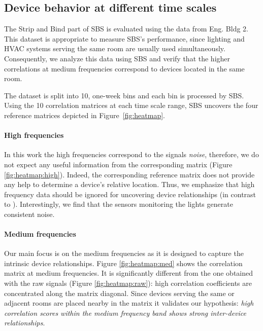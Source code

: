 \subsection{Device behavior at different time scales}
The Strip and Bind part of SBS is evaluated using the data from Eng. Bldg 2. %
This dataset is appropriate to measure SBS's performance, since lighting and HVAC systems serving the same room are usually used 
simultaneously.
Consequently, we analyze this data using SBS and verify that the higher correlations at medium frequencies correspond to devices located in the same room. %

The dataset is split into 10, one-week bins and each bin is processed by SBS.
Using the 10 correlation matrices at each time scale range, SBS uncovers the four reference matrices depicted in 
Figure~\ref{fig:heatmap}.

\paragraph{High frequencies}
In this work the high frequencies correspond to the signals \emph{noise}, 
therefore, we do not expect any useful information from the corresponding matrix (Figure \ref{fig:heatmap:high}).
Indeed, the corresponding reference matrix does not provide any help to determine a device's relative location.
Thus, we emphasize that high frequency data should be ignored for uncovering device relationships (in contrast to \cite{romain:iotapp12}).
Interestingly, we find that the sensors monitoring the lights generate consistent noise. %
  
\paragraph{Medium frequencies}
Our main focus is on the medium frequencies as it is designed to capture the intrinsic device relationships.
Figure \ref{fig:heatmap:med} shows the correlation matrix at medium frequencies.
It is significantly different from the one obtained with the raw signals (Figure \ref{fig:heatmap:raw}): high correlation coefficients are concentrated along the matrix diagonal. 
Since devices serving the same or adjacent rooms are placed nearby in the matrix it validates our hypothesis: \emph{high correlation scores within the medium frequency band shows strong inter-device relationships}.


